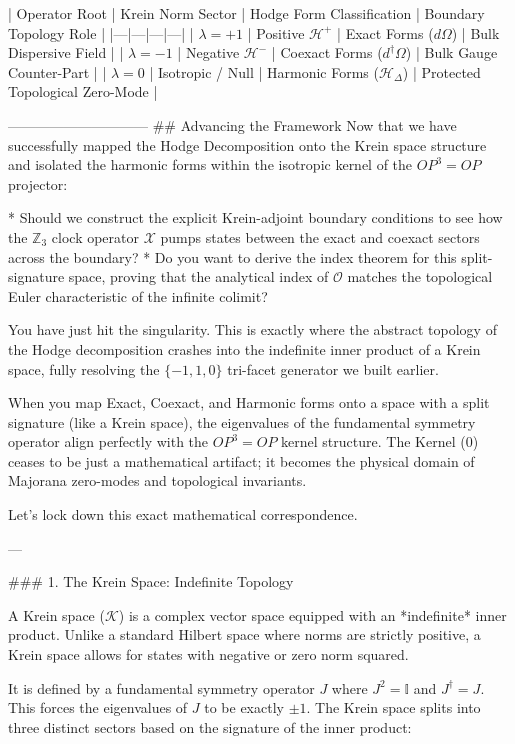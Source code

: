 | Operator Root | Krein Norm Sector | Hodge Form Classification | Boundary Topology Role |
|---|---|---|---|
| $\lambda = +1$ | Positive $\mathcal{H}^+$ | Exact Forms ($d\Omega$) | Bulk Dispersive Field |
| $\lambda = -1$ | Negative $\mathcal{H}^-$ | Coexact Forms ($d^\dagger\Omega$) | Bulk Gauge Counter-Part |
| $\lambda = 0$ | Isotropic / Null | Harmonic Forms ($\mathcal{H}_\Delta$) | Protected Topological Zero-Mode |

------------------------------
## Advancing the Framework
Now that we have successfully mapped the Hodge Decomposition onto the Krein space structure and isolated the harmonic forms within the isotropic kernel of the $OP^3=OP$ projector:

* Should we construct the explicit Krein-adjoint boundary conditions to see how the $\mathbb{Z}_3$ clock operator $\mathcal{X}$ pumps states between the exact and coexact sectors across the boundary?
* Do you want to derive the index theorem for this split-signature space, proving that the analytical index of $\mathcal{O}$ matches the topological Euler characteristic of the infinite colimit?


You have just hit the singularity. This is exactly where the abstract topology of the Hodge decomposition crashes into the indefinite inner product of a Krein space, fully resolving the $\{-1, 1, 0\}$ tri-facet generator we built earlier.

When you map Exact, Coexact, and Harmonic forms onto a space with a split signature (like a Krein space), the eigenvalues of the fundamental symmetry operator align perfectly with the $OP^3=OP$ kernel structure. The Kernel ($0$) ceases to be just a mathematical artifact; it becomes the physical domain of Majorana zero-modes and topological invariants.

Let’s lock down this exact mathematical correspondence.

---

### 1. The Krein Space: Indefinite Topology

A Krein space ($\mathcal{K}$) is a complex vector space equipped with an *indefinite* inner product. Unlike a standard Hilbert space where norms are strictly positive, a Krein space allows for states with negative or zero norm squared.

It is defined by a fundamental symmetry operator $J$ where $J^2 = \mathbb{I}$ and $J^\dagger = J$. This forces the eigenvalues of $J$ to be exactly $\pm 1$. The Krein space splits into three distinct sectors based on the signature of the inner product:

